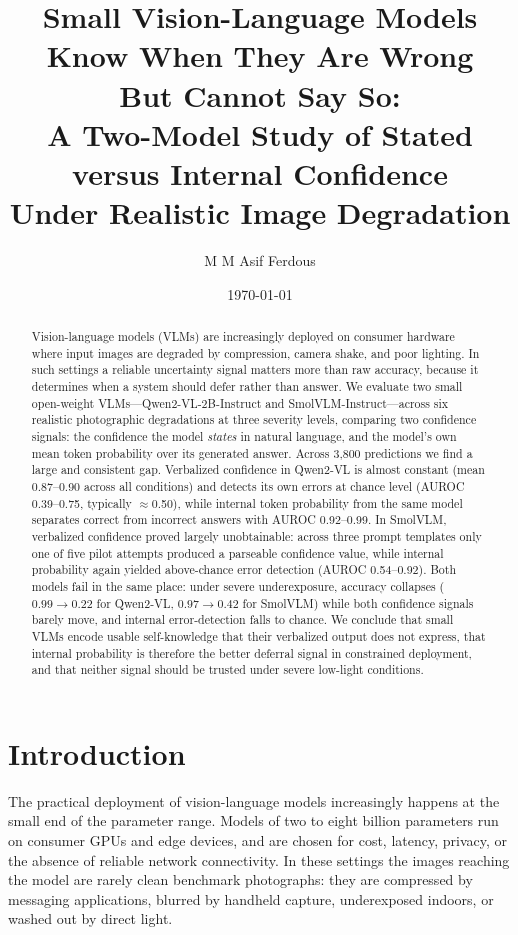 \documentclass[11pt]{article}
\title{Small Vision-Language Models Know When They Are Wrong\\
But Cannot Say So:\\
\large A Two-Model Study of Stated versus Internal Confidence\\
Under Realistic Image Degradation}
\author[1]{M M Asif Ferdous}
\affil[1]{Independent Researcher}
\date{\today}
\begin{document}
\maketitle

\begin{abstract}
Vision-language models (VLMs) are increasingly deployed on consumer hardware
where input images are degraded by compression, camera shake, and poor lighting.
In such settings a reliable uncertainty signal matters more than raw accuracy,
because it determines when a system should defer rather than answer. We evaluate
two small open-weight VLMs---Qwen2-VL-2B-Instruct and SmolVLM-Instruct---across
six realistic photographic degradations at three severity levels, comparing two
confidence signals: the confidence the model \emph{states} in natural language,
and the model's own mean token probability over its generated answer. Across
3{,}800 predictions we find a large and consistent gap. Verbalized confidence in
Qwen2-VL is almost constant (mean 0.87--0.90 across all conditions) and detects
its own errors at chance level (AUROC 0.39--0.75, typically $\approx$0.50),
while internal token probability from the same model separates correct from
incorrect answers with AUROC 0.92--0.99. In SmolVLM, verbalized confidence
proved largely unobtainable: across three prompt templates only one of five
pilot attempts produced a parseable confidence value, while internal probability
again yielded above-chance error detection (AUROC 0.54--0.92). Both models fail
in the same place: under severe underexposure, accuracy collapses
($0.99\rightarrow0.22$ for Qwen2-VL, $0.97\rightarrow0.42$ for SmolVLM) while
both confidence signals barely move, and internal error-detection falls to
chance. We conclude that small VLMs encode usable self-knowledge that their
verbalized output does not express, that internal probability is therefore the
better deferral signal in constrained deployment, and that neither signal should
be trusted under severe low-light conditions.
\end{abstract}

\section{Introduction}

The practical deployment of vision-language models increasingly happens at the
small end of the parameter range. Models of two to eight billion parameters run
on consumer GPUs and edge devices, and are chosen for cost, latency, privacy, or
the absence of reliable network connectivity. In these settings the images
reaching the model are rarely clean benchmark photographs: they are compressed
by messaging applications, blurred by handheld capture, underexposed indoors, or
washed out by direct light.
\end{document}
